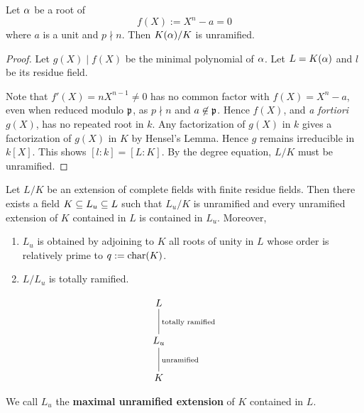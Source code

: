 \begin{lem}
Let $\alpha$ be a root of
\[
f(X):=X^n-a=0
\]
where $a$ is a unit and $p\nmid n$. Then $K(\alpha)/K$ is unramified.
\end{lem}
\begin{proof}
Let $g(X)\mid f(X)$ be the minimal polynomial of $\alpha$. Let $L=K(\alpha)$ and $l$ be its residue field.

Note that $f'(X)=nX^{n-1}\ne 0$ has no common factor with $f(X)=X^n-a$, even when reduced modulo $\mathfrak{p}$, as $p\nmid n$ and $a\not\in \mathfrak{p}$. Hence $f(X)$, and {\it a fortiori} $g(X)$, has no repeated root in $k$. Any factorization of $g(X)$ in $k$ gives a factorization of $g(X)$ in $K$ by Hensel's Lemma. Hence $g$ remains irreducible in $k[X]$. This shows $[l:k]=[L:K]$. By the degree equation, $L/K$ must be unramified.
\end{proof}
\begin{thm}
Let $L/K$ be an extension of complete fields with finite residue fields. Then %
there exists a field $K\subseteq L_u\subseteq L$ such that $L_u/K$ is unramified and every unramified extension of $K$ contained in $L$ is contained in $L_u$. Moreover,
\begin{enumerate}
\item
$L_u$ is obtained by adjoining to $K$ all roots of unity in $L$ whose order is relatively prime to $q:=\operatorname{char}(K)$.
\item $L/L_u$ is totally ramified.
\end{enumerate}
\[
\xymatrix{
L\ar@{-}[d]^{\text{totally ramified}}\\
L_u\ar@{-}[d]^{\text{unramified}}\\
K
}
\]
\end{thm}
We call $L_u$ the \textbf{maximal unramified extension} of $K$ contained in $L$.  
